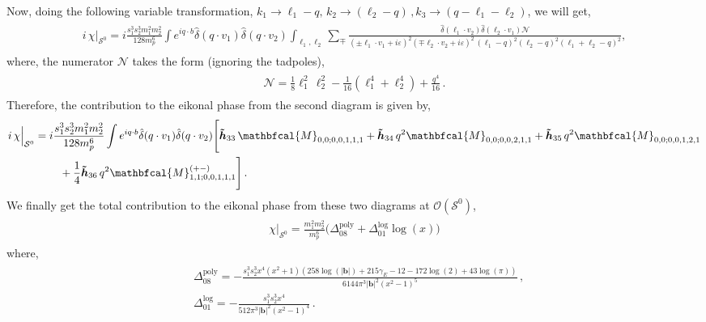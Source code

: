 Now, doing the following variable transformation, $k_1\to \ell_1-q,\,k_2\to (\ell_2-q)\,,k_3\to (q-\ell_1-\ell_2)$, we will get,
\begin{align}
    \begin{split}
   \hspace{0cm}   i\,  \chi \Big|_{\mathcal{S}^0}=i\frac{s_1^3 s_2^3 m_1^2 m_2^2} {128 m_p^6}  \int e^{i q\cdot b}\hat\delta(q\cdot v_1)\hat\delta(q\cdot v_2)\int_{\ell_1,\ell_2}\sum_{\mp}\frac{\hat\delta(\ell_1\cdot v_2)\hat\delta(\ell_2\cdot v_1)\mathcal{N}}{(\pm\ell_1\cdot v_1+i\varepsilon)^2(\mp\ell_2\cdot v_2+i\varepsilon)^2\,(\ell_1-q)^2(\ell_2-q)^2(\ell_1+\ell_2-q)^2},
    \end{split}
\end{align}
where, the numerator $\mathcal{N}$ takes the form (ignoring the tadpoles),
\begin{align}
    \begin{split}
        \mathcal{N}=\frac{1}{8}\ell_1^2\,\ell_2^2-\frac{1}{16}(\ell_1^4+\ell_2^4)+\frac{q^4}{16}\,.
    \end{split}
\end{align}
Therefore, the contribution to the eikonal phase from the second diagram is given by,
\begin{align}
    \begin{split}
       i\, \chi\Big|_{\mathcal{S}^0}&=i\frac{s_1^3 s_2^3 m_1^2 m_2^2} {128 m_p^6}  \int e^{iq\cdot b}\hat\delta(q\cdot v_1)\hat\delta(q\cdot v_2)\Bigg[\boldsymbol{\tilde h}_{33}\,\mathbfcal{M}_{0,0;0,0,1,1,1}+\boldsymbol{\tilde h}_{34}\,q^2 \mathbfcal{M}_{0,0;0,0,2,1,1}+\boldsymbol{\tilde h}_{35}\,q^2 \mathbfcal{M}_{0,0;0,0,1,2,1}\\ &\hspace{0.8cm}+\frac{1}{4}\boldsymbol{\tilde h}_{36}\,q^2 \mathbfcal{M}^{(+-)}_{1,1;0,0,1,1,1}\Bigg]\,.
    \end{split}
\end{align}
We finally get the total contribution to the eikonal phase from these two diagrams at $\mathcal{O}(\mathcal{S}^0)$, 
\begin{align}
\begin{split} \label{eqt6}
 \chi\Big|_{\mathcal{S}^0} =\frac{m_1^2m_2^2}{m_p^6}\Bigg(\Delta_{\mathfrak{08}}^{\textrm{poly}}+\Delta_{\mathfrak{01}}^{\textrm{log}}\log (x)\Bigg)
\end{split}
\end{align}
where,
\begin{align}
\begin{split}
&\Delta_{\mathfrak{08}}^{\textrm{poly}}= -\frac{ s_1^3 s_2^3 x^4 \left(x^2+1\right) (258 \log (|\boldsymbol{b}|)+215 \gamma_E -12-172 \log (2)+43 \log (\pi ))}{6144 \pi ^3 |\boldsymbol{b}|^2 \left(x^2-1\right)^5 }\,,\\&
\Delta_{\mathfrak{01}}^{\textrm{log}}=-\frac{ s_1^3 s_2^3 x^4}{512 \pi ^3 |\boldsymbol{b}|^2 \left(x^2-1\right)^4 }\,.
\end{split}
\end{align}
